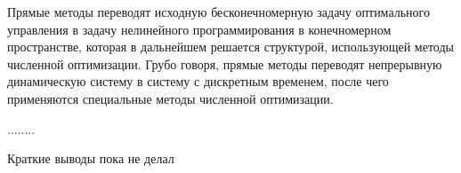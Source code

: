 Прямые методы переводят исходную бесконечномерную задачу оптимального управления в задачу нелинейного программирования в конечномерном пространстве, которая в дальнейшем решается структурой, использующей методы численной оптимизации. Грубо говоря, прямые методы переводят непрерывную динамическую систему в систему с дискретным временем, после чего применяются специальные методы численной оптимизации. 


........

\bigskip
Краткие выводы пока не делал 
